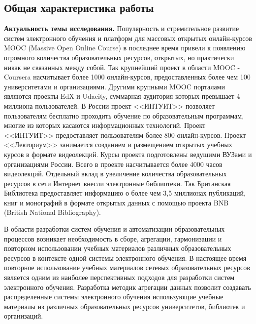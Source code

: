 \subsection*{\Large Общая характеристика работы}
\fontsize{14pt}{15pt}\selectfont


\textbf{Актуальность темы исследования.}
Популярность и стремительное развитие систем электронного обучения и платформ для массовых открытых онлайн-курсов MOOC (Massive Open Online Course) в последнее время привели к появлению огромного количества образовательных ресурсов, открытых, но практически никак не связанных между собой. Так крупнейший проект в области MOOC - Coursera насчитывает более 1000 онлайн-курсов, предоставленных более чем 100 университетами и организациями. Другими крупными MOOC порталами являются проекты EdX и Udacity, суммарная аудитория которых превышает 4 миллиона пользователей. В России проект <<ИНТУИТ>> позволяет пользователям бесплатно проходить обучение по образовательным программам, многие из которых касаются информационных технологий. Проект <<ИНТУИТ>> предоставляет пользователям более 800 онлайн-курсов. Проект <<Лекториум>> занимается созданием и размещением открытых учебных курсов в формате видеолекций. Курсы проекта подготовлены ведущими ВУЗами и организациями России. Всего в проекте насчитывается более 4000 часов видеолекций. Отдельный вклад в увеличение количества образовательных ресурсов в сети Интернет внесли электронные библиотеки. Так Британская Библиотека предоставляет информацию о более чем 3,5 миллионах публикаций, книг и монографий в формате открытых данных с помощью проекта BNB (British National Bibliography). 

В области разработки систем обучения и автоматизации образовательных процессов возникает необходимость в сборе, агрегации, гармонизации и повторном использовании учебных материалов различных образовательных ресурсов в контексте одной системы электронного обучения. В настоящее время повторное использование учебных материалов сетевых образовательных ресурсов является одним из наиболее перспективных подходов для разработки систем электронного обучения. Разработка методик агрегации данных позволит создавать распределенные системы электронного обучения использующие учебные материалы из различных образовательных ресурсов университетов, библиотек и организаций.

